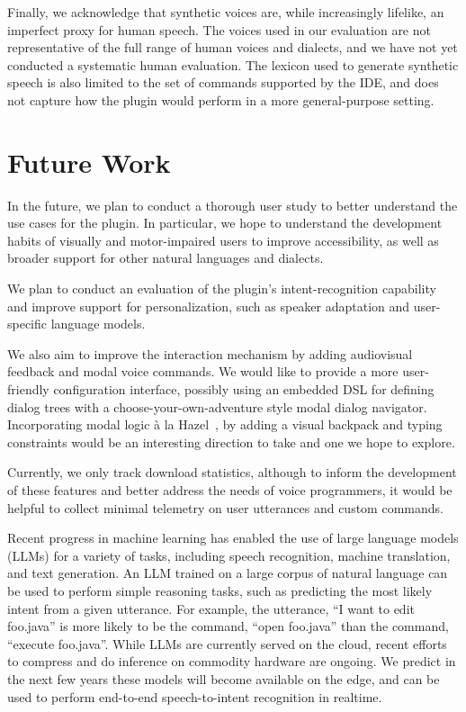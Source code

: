 \documentclass[conference]{IEEEtran}
\begin{document}
Finally, we acknowledge that synthetic voices are, while increasingly lifelike, an imperfect proxy for human speech. The voices used in our evaluation are not representative of the full range of human voices and dialects, and we have not yet conducted a systematic human evaluation. The lexicon used to generate synthetic speech is also limited to the set of commands supported by the IDE, and does not capture how the plugin would perform in a more general-purpose setting.

\section{Future Work}

In the future, we plan to conduct a thorough user study to better understand the use cases for the plugin. In particular, we hope to understand the development habits of visually and motor-impaired users to improve accessibility, as well as broader support for other natural languages and dialects.

We plan to conduct an evaluation of the plugin's intent-recognition capability and improve support for personalization, such as speaker adaptation and user-specific language models.

We also aim to improve the interaction mechanism by adding audiovisual feedback and modal voice commands. We would like to provide a more user-friendly configuration interface, possibly using an embedded DSL for defining dialog trees with a choose-your-own-adventure style modal dialog navigator. Incorporating modal logic \`a la Hazel~\cite{omar2021filling}, by adding a visual backpack and typing constraints would be an interesting direction to take and one we hope to explore.

Currently, we only track download statistics, although to inform the development of these features and better address the needs of voice programmers, it would be helpful to collect minimal telemetry on user utterances and custom commands.

Recent progress in machine learning has enabled the use of large language models (LLMs) for a variety of tasks, including speech recognition, machine translation, and text generation. An LLM trained on a large corpus of natural language can be used to perform simple reasoning tasks, such as predicting the most likely intent from a given utterance. For example, the utterance, ``I want to edit foo.java'' is more likely to be the command, ``open foo.java'' than the command, ``execute foo.java''. While LLMs are currently served on the cloud, recent efforts to compress and do inference on commodity hardware are ongoing. We predict in the next few years these models will become available on the edge, and can be used to perform end-to-end speech-to-intent recognition in realtime.
\end{document}
